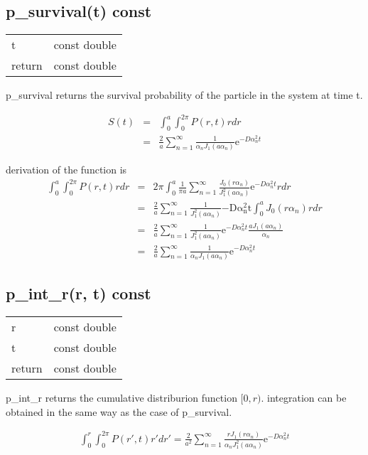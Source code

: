 \documentclass{article}
\begin{document}
\subsection{p\_survival(t) const}

\begin{table}[htb]
    \begin{tabular}{ll}
        t       & const double\\
        return  & const double
    \end{tabular}
\end{table}

p\_survival returns the survival probability of the particle in the system at time t.

\begin{eqnarray}
    S(t) &=& \int^a_0 \int^{2\pi}_0 P(r,t) rdr \nonumber \\
         &=& \frac{2}{a}\sum^{\infty}_{n=1}\frac{1}{\alpha_n J_1(a\alpha_n)}
             \mathrm{e}^{-D\alpha^2_nt}\nonumber
\end{eqnarray}

derivation of the function is
\begin{eqnarray}
    \int^a_0 \int^{2\pi}_0 P(r, t) r dr
    &=&
    2\pi \int^a_0 \frac{1}{\pi a}
    \sum^{\infty}_{n=1}\frac{J_0(r\alpha_n)}{J^2_1(a\alpha_n)}
                       \mathrm{e}^{-D\alpha^2_nt} rdr \nonumber \\
    &=& \frac{2}{a}\sum^{\infty}_{n=1}
                       \frac{1}{J^2_1(a\alpha_n)}
                       \mathrm{-D\alpha^2_nt} \int^a_0 J_0(r\alpha_n) rdr
        \nonumber \\
    &=& \frac{2}{a}\sum^{\infty}_{n=1}
                       \frac{1}{J^2_1(a\alpha_n)}
                       \mathrm{e}^{-D\alpha^2_nt} \frac{aJ_1(a\alpha_n)}{\alpha_n}
        \nonumber \\
    &=& \frac{2}{a}\sum^{\infty}_{n=1}
                       \frac{1}{\alpha_n J_1(a\alpha_n)}
                       \mathrm{e}^{-D\alpha^2_nt} \nonumber
\end{eqnarray}

\subsection{p\_int\_r(r, t) const}

\begin{table}[htb]
    \begin{tabular}{ll}
        r       & const double\\
        t       & const double\\
        return  & const double
    \end{tabular}
\end{table}

p\_int\_r returns the cumulative distriburion function $[0,r)$.
integration can be obtained in the same way as the case of p\_survival.

\begin{eqnarray}
    \int^r_0 \int^{2\pi}_0 P(r',t) r'dr' =
    \frac{2}{a^2}\sum^{\infty}_{n=1}
        \frac{rJ_1(r\alpha_n)}{\alpha_n J^2_1(a\alpha_n)}
        \mathrm{e}^{-D\alpha^2_nt}\nonumber
\end{eqnarray}
\end{document}
